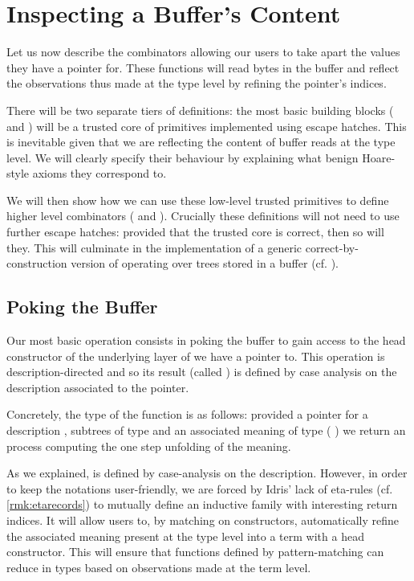 \section{Inspecting a Buffer's Content}\label{sec:poking}

Let us now describe the combinators allowing our users to
take apart the values they have a pointer for.
%
These functions will read bytes in the buffer and reflect
the observations thus made at the type level by refining
the pointer's indices.

There will be two separate tiers of definitions: the most
basic building blocks ( and )
will be a trusted core of primitives implemented using
escape hatches.
%
This is inevitable given that we are reflecting the content
of buffer reads at the type level.
%
We will clearly specify their behaviour by explaining what
benign Hoare-style axioms they correspond to.

We will then show how we can use these low-level trusted
primitives to define higher level combinators
( and ).
%
Crucially these definitions will not need to use further
escape hatches: provided that the trusted core is correct,
then so will they.
%
This will culminate in the implementation of a generic
correct-by-construction version of 
operating over trees stored in a buffer (cf. ).

\subsection{Poking the Buffer}

Our most basic operation consists in poking the buffer to gain
access to the head constructor of the underlying layer of
 we have a pointer to.
%
This operation is description-directed and so its result (called
) is defined by case analysis on the description
associated to the pointer.

Concretely, the type of the function is as follows: provided a pointer for
a description , subtrees of type  and an
associated meaning  of type
(  )
we return an  process computing the one step
unfolding of the meaning.


As we explained,  is defined by case-analysis
on the description.
%
However, in order to keep the notations user-friendly, we
are forced by Idris' lack of eta-rules (cf. \cref{rmk:etarecords})
to mutually define
an inductive family  with interesting return
indices.
%
It will allow users to, by matching on 
constructors, automatically refine the associated meaning
present at the type level into a term with a head constructor.
%
This will ensure that functions defined by pattern-matching
can reduce in types based on observations made at the term
level.

